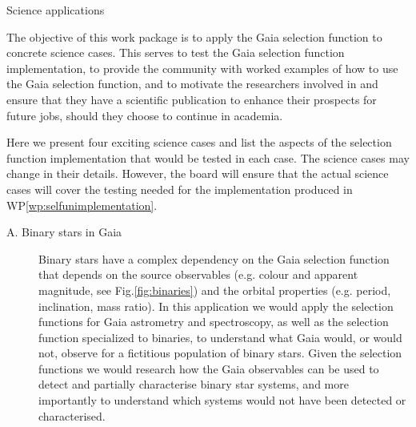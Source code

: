 \begin{workpackage}{Science applications}
  \label{wp:scienceappl}
  \wpend{\duration} %

  \makewptable %

  \begin{wpobjectives}
    The objective of this work package is to apply the Gaia selection function to concrete science cases. This serves to test the Gaia selection function implementation, to provide the community with worked examples of how to use the Gaia selection function, and to motivate the researchers involved in {\acro} and ensure that they have a scientific publication to enhance their prospects for future jobs, should they choose to continue in academia.
    
    Here we present four exciting science cases and list the aspects of the selection function implementation that would be tested in each case. The science cases may change in their details. However, the {\acro} board will ensure that the actual science cases will cover the testing needed for the implementation produced in WP\ref{wp:selfunimplementation}.
    
    \begin{description}
      \item[A. Binary stars in Gaia] {
        Binary stars have a complex dependency on the Gaia selection function that depends on the source observables (e.g. colour and apparent magnitude, see Fig.\ref{fig:binaries}) and the orbital properties (e.g. period, inclination, mass ratio). In this application we would apply the selection functions for Gaia astrometry and spectroscopy, as well as the selection function specialized to binaries, to understand what Gaia would, or would not, observe for a fictitious population of binary stars. Given the selection functions we would research how the Gaia observables can be used to detect and partially characterise binary star systems, and more importantly to understand which systems would not have been detected or characterised. 

}
\end{description}
\end{wpobjectives}
\end{workpackage}
